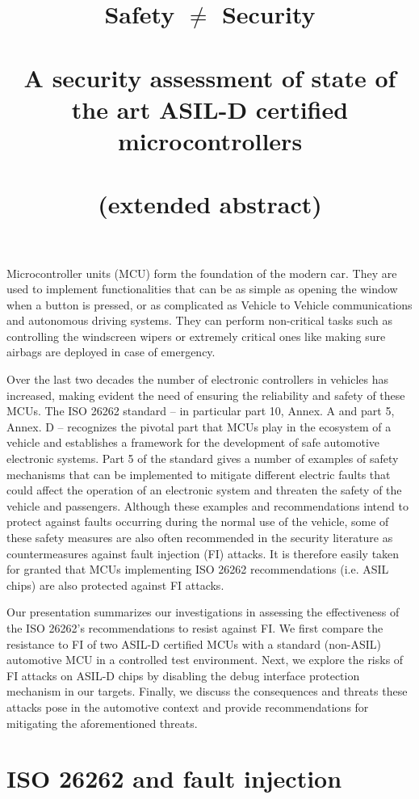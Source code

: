 \documentclass[a4paper, 10pt]{article}
\title{Safety $\neq$ Security \\
\ \\
\large A security assessment of state of the art ASIL-D certified microcontrollers \\
\ \\
\small {\bf (extended abstract)}}
\date{}
\begin{document}
\maketitle
 
\noindent Microcontroller units (MCU) form the foundation of the modern car. They are used to implement functionalities that can be as simple as opening the window when a button is pressed, or as complicated as Vehicle to Vehicle communications and autonomous driving systems. They can perform non-critical tasks such as controlling the windscreen wipers or extremely critical ones like making sure airbags are deployed in case of emergency. 
 
Over the last two decades the number of electronic controllers in vehicles has increased, making evident the need of ensuring the reliability and safety of these MCUs. 
The ISO 26262 standard -- in particular part 10, Annex. A and part 5, Annex. D -- recognizes the pivotal part that MCUs play in the ecosystem of a vehicle and establishes a framework for the development of safe automotive electronic systems. Part 5 of the standard gives a number of examples of safety mechanisms that can be implemented to mitigate different electric faults that could affect the operation of an electronic system and threaten the safety of the vehicle and passengers. Although these examples and recommendations intend to protect against faults occurring during the normal use of the vehicle, some of these safety measures are also often recommended in the security literature as countermeasures against fault injection (FI) attacks. It is therefore easily taken for granted that MCUs implementing ISO 26262 recommendations (i.e. ASIL chips) are also protected against FI attacks.

Our presentation summarizes our investigations in assessing the effectiveness of the ISO 26262's recommendations to resist against FI. We first compare the resistance to FI of two ASIL-D certified MCUs with a standard (non-ASIL) automotive MCU in a controlled test environment. Next, we explore the risks of FI attacks on ASIL-D chips by disabling the debug interface protection mechanism in our targets. Finally, we discuss the consequences and threats these attacks pose in the automotive context and provide recommendations for mitigating the aforementioned threats.

\section{ISO 26262 and fault injection}
\end{document}
